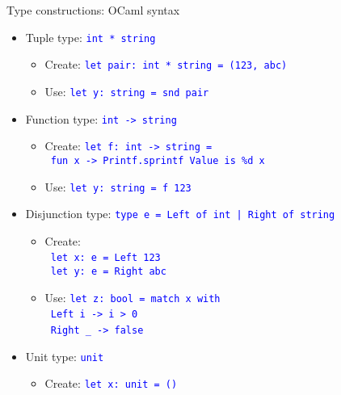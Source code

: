 \documentclass[english]{beamer}
\begin{document}
\begin{frame}{Type constructions: OCaml syntax}

\begin{itemize}
\item Tuple type: \texttt{\textcolor{blue}{\footnotesize{}int {*} string}}{\footnotesize \par}
\begin{itemize}
\item Create: \texttt{\textcolor{blue}{\footnotesize{}let pair:\ int {*}
string = (123, \textquotedbl{}abc\textquotedbl{})}} 
\item Use: \texttt{\textcolor{blue}{\footnotesize{}let y:\ string = snd
pair}}{\footnotesize \par}
\end{itemize}
\item Function type: \texttt{\textcolor{blue}{\footnotesize{}int -> string}}{\footnotesize \par}
\begin{itemize}
\item Create: \texttt{\textcolor{blue}{\footnotesize{}let f:\ int -> string
=}}~\\
\texttt{\textcolor{blue}{\footnotesize{} fun x -> Printf.sprintf \textquotedbl{}Value
is \%d\textquotedbl{} x}} 
\item Use: \texttt{\textcolor{blue}{\footnotesize{}let y:\ string = f 123}}{\footnotesize \par}
\end{itemize}
\item Disjunction type: \texttt{\textcolor{blue}{\footnotesize{}type e =
Left of int | Right of string}}{\footnotesize \par}
\begin{itemize}
\item Create:\\
 \texttt{\textcolor{blue}{\footnotesize{}\ let x:\ e = Left 123}}~\\
\texttt{\textcolor{blue}{\footnotesize{} let y:\ e = Right \textquotedbl{}abc\textquotedbl{}}}{\footnotesize \par}
\item Use: \texttt{\textcolor{blue}{\footnotesize{}let z:\ bool = match
x with}}~\\
\texttt{\textcolor{blue}{\footnotesize{} Left i -> i > 0}}~\\
\texttt{\textcolor{blue}{\footnotesize{} Right \_ -> false}}~\\
{\footnotesize \par}
\end{itemize}
\item Unit type: \texttt{\textcolor{blue}{\footnotesize{}unit}}{\footnotesize \par}
\begin{itemize}
\item Create: \texttt{\textcolor{blue}{\footnotesize{}let x:\ unit = ()}}{\footnotesize \par}
\end{itemize}
\end{itemize}
\end{frame}
\end{document}
